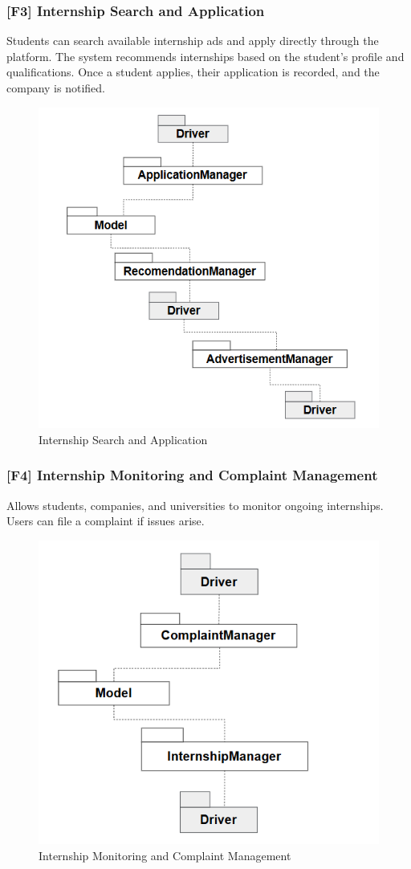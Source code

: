 \subsubsection*{[F3] Internship Search and Application}
Students can search available internship ads and apply directly through the platform.
The system recommends internships based on the student’s profile and qualifications.
Once a student applies, their application is recorded, and the company is notified.

\begin{figure}[h]
    \centering
    \includegraphics[width=0.5\linewidth]{DD-Latex//assets//Component Integration Graphs/component3.png}
    \caption{Internship Search and Application}
\end{figure}

\subsubsection*{[F4] Internship Monitoring and Complaint Management}
Allows students, companies, and universities to monitor ongoing internships.
Users can file a complaint if issues arise.

\begin{figure}[h]
    \centering
    \includegraphics[width=0.5\linewidth]{DD-Latex//assets//Component Integration Graphs/component4.png}
    \caption{Internship Monitoring and Complaint Management}
\end{figure}

